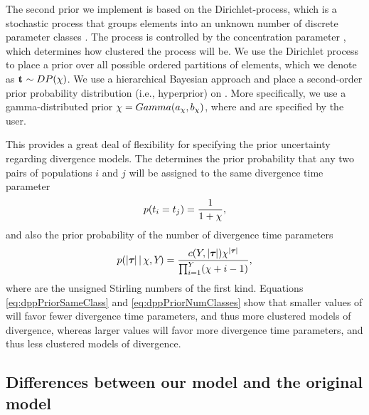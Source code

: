 \documentclass[letterpaper,12pt]{article}
\begin{document}
\begin{linenumbers}
The second prior we implement is based on the Dirichlet-process, which is a
stochastic process that groups elements into an unknown number of discrete
parameter classes \citep{Ferguson1973,Antoniak1974}.
The process is controlled by the concentration parameter \concentrationParam,
which determines how clustered the process will be.
We use the Dirichlet process to place a prior over all possible ordered
partitions of \npairs{} elements, which we denote as $\mathbf{t_{}} \sim
DP(\chi )$.
We use a hierarchical Bayesian approach and place a second-order prior
probability distribution (i.e., hyperprior) on \concentrationParam.  More
specifically, we use a gamma-distributed prior $\chi =
Gamma(a_{\chi}, b_{\chi})$,
where \gammaShape{\concentrationParam} and \gammaScale{\concentrationParam} are
specified by the user.

\begin{linenomath}
This provides a great deal of flexibility for specifying the prior uncertainty
regarding divergence models.
The \concentrationParam determines the prior probability that any two
pairs of populations $i$ and $j$ will be assigned to the same divergence time
parameter
\begin{equation}
    p(t_{i} = t_{j}) = \frac{1}{1 + \chi},
    \label{eq:dppPriorSameClass}
\end{equation}
and also the prior probability of the number of divergence time parameters
\begin{equation}
    p(\lvert \boldsymbol{\tau_{}} \rvert \,|\, \chi, Y_{}) = 
    \frac{c(Y_{}, \lvert \boldsymbol{\tau_{}} \rvert) \chi^{\lvert \boldsymbol{\tau_{}} \rvert}}
    {\prod_{i=1}^{Y_{}}(\chi + i - 1)},
    \label{eq:dppPriorNumClasses}
\end{equation}
where \stirlingFirst{\cdot}{\cdot} are the unsigned Stirling numbers of the
first kind.
Equations \ref{eq:dppPriorSameClass} and \ref{eq:dppPriorNumClasses} show that
smaller values of \concentrationParam will favor fewer divergence time
parameters, and thus more clustered models of divergence, whereas larger values
will favor more divergence time parameters, and thus less clustered models of
divergence.
\end{linenomath}

\subsection*{Differences between our model and the original \msb model}

\end{linenumbers}
\end{document}
